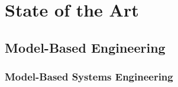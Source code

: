 \chapter{State of the Art}
\label{sec:state-of-the-art}

\section{Model-Based Engineering}
\label{sec:model-based-engineering}

\subsection{Model-Based Systems Engineering}
\label{sec:model-based-systems-engineering}
